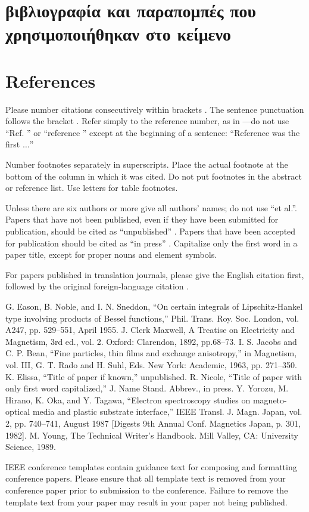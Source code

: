 \documentclass[conference]{IEEEtran}
\begin{document}
\section{βιβλιογραφία και παραπομπές που χρησιμοποιήθηκαν στο κείμενο}

\section*{References}

Please number citations consecutively within brackets \cite{b1}. The 
sentence punctuation follows the bracket \cite{b2}. Refer simply to the reference 
number, as in \cite{b3}---do not use ``Ref. \cite{b3}'' or ``reference \cite{b3}'' except at 
the beginning of a sentence: ``Reference \cite{b3} was the first $\ldots$''

Number footnotes separately in superscripts. Place the actual footnote at 
the bottom of the column in which it was cited. Do not put footnotes in the 
abstract or reference list. Use letters for table footnotes.

Unless there are six authors or more give all authors' names; do not use 
``et al.''. Papers that have not been published, even if they have been 
submitted for publication, should be cited as ``unpublished'' \cite{b4}. Papers 
that have been accepted for publication should be cited as ``in press'' \cite{b5}. 
Capitalize only the first word in a paper title, except for proper nouns and 
element symbols.

For papers published in translation journals, please give the English 
citation first, followed by the original foreign-language citation \cite{b6}.

\begin{thebibliography}{00}
 G. Eason, B. Noble, and I. N. Sneddon, ``On certain integrals of Lipschitz-Hankel type involving products of Bessel functions,'' Phil. Trans. Roy. Soc. London, vol. A247, pp. 529--551, April 1955.
 J. Clerk Maxwell, A Treatise on Electricity and Magnetism, 3rd ed., vol. 2. Oxford: Clarendon, 1892, pp.68--73.
 I. S. Jacobs and C. P. Bean, ``Fine particles, thin films and exchange anisotropy,'' in Magnetism, vol. III, G. T. Rado and H. Suhl, Eds. New York: Academic, 1963, pp. 271--350.
 K. Elissa, ``Title of paper if known,'' unpublished.
 R. Nicole, ``Title of paper with only first word capitalized,'' J. Name Stand. Abbrev., in press.
 Y. Yorozu, M. Hirano, K. Oka, and Y. Tagawa, ``Electron spectroscopy studies on magneto-optical media and plastic substrate interface,'' IEEE Transl. J. Magn. Japan, vol. 2, pp. 740--741, August 1987 [Digests 9th Annual Conf. Magnetics Japan, p. 301, 1982].
 M. Young, The Technical Writer's Handbook. Mill Valley, CA: University Science, 1989.
\end{thebibliography}
\vspace{12pt}
\color{red}
IEEE conference templates contain guidance text for composing and formatting conference papers. Please ensure that all template text is removed from your conference paper prior to submission to the conference. Failure to remove the template text from your paper may result in your paper not being published.
\end{document}
